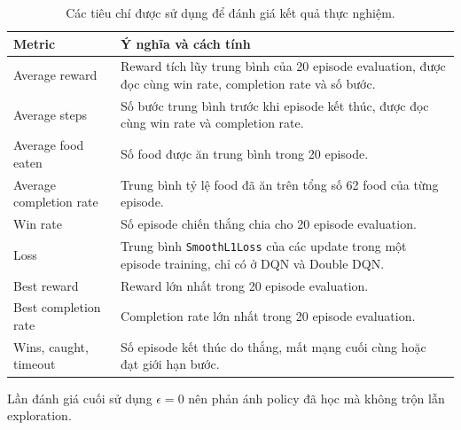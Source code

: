 \begin{table}[H]
    \centering
    \renewcommand{\arraystretch}{1.08}
    \captionsetup{skip=5pt}
    \small
    \begin{tabularx}{0.96\textwidth}{@{}
        >{\raggedright\arraybackslash}p{3.4cm}
        >{\raggedright\arraybackslash}X
    @{}}
        \toprule
        \textbf{Metric} & \textbf{Ý nghĩa và cách tính} \\
        \midrule
        Average reward & Reward tích lũy trung bình của 20 episode evaluation, được đọc cùng win rate, completion rate và số bước. \\
        Average steps & Số bước trung bình trước khi episode kết thúc, được đọc cùng win rate và completion rate. \\
        Average food eaten & Số food được ăn trung bình trong 20 episode. \\
        Average completion rate & Trung bình tỷ lệ food đã ăn trên tổng số 62 food của từng episode. \\
        Win rate & Số episode chiến thắng chia cho 20 episode evaluation. \\
        Loss & Trung bình \texttt{SmoothL1Loss} của các update trong một episode training, chỉ có ở DQN và Double DQN. \\
        Best reward & Reward lớn nhất trong 20 episode evaluation. \\
        Best completion rate & Completion rate lớn nhất trong 20 episode evaluation. \\
        Wins, caught, timeout & Số episode kết thúc do thắng, mất mạng cuối cùng hoặc đạt giới hạn bước. \\
        \bottomrule
    \end{tabularx}
    \caption{Các tiêu chí được sử dụng để đánh giá kết quả thực nghiệm.}
    \label{tab:evaluation-metrics}
\end{table}

Lần đánh giá cuối sử dụng $\epsilon=0$ nên phản ánh policy đã học mà không trộn lẫn exploration.
